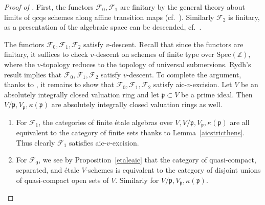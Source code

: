 \documentclass[reqno]{amsart}
\newcommand{\sF}{\mathcal{F}}
\newcommand{\spec}{\mathrm{Spec}}
\theoremstyle{definition}
\begin{document}
\begin{proof}[Proof of ] 
First, the functors $\sF_0, \sF_1$ are finitary by the general theory about limits
of qcqs schemes along affine transition maps (cf.~\cite[Tag
081C]{stacks-project}).  Similarly $\sF_2$ is finitary, as a presentation of
the algebraic space can be descended, cf.~\cite[Tags 07SJ, 084V]{stacks-project}. 


The functors $\sF_0, \sF_1, \sF_2$ satisfy $v$-descent. 
Recall that since the functors are finitary, it suffices to check $v$-descent on
schemes of finite type over $\spec( \mathbb{Z})$, where the $v$-topology
reduces to the topology of universal
submersions. Rydh's result \cite[Cor.~5.18]{Rydh} implies that $\sF_0,
\sF_1, \sF_2$ satisfy
$v$-descent. 
To complete the argument, thanks to ,  it remains to show that $\sF_0, \sF_1, \sF_2$ satisfy
aic-$v$-excision. 
Let $V$ be an absolutely integrally closed valuation ring and let $\mathfrak{p} \subset V$ be a prime
ideal. 
Then $V/\mathfrak{p}, V_{\mathfrak{p}}, \kappa( \mathfrak{p})$ are absolutely integrally closed valuation rings as well.
\begin{enumerate}
\item  
For $\sF_1$, 
 the
categories of finite \'etale algebras over $V, V/\mathfrak{p},
V_{\mathfrak{p}}, \kappa( \mathfrak{p})$ are all equivalent to the category of
finite sets thanks to Lemma~\ref{aicstricthens}. Thus clearly $\sF_1$ satisfies
aic-$v$-excision. 

\item
For $\sF_0$, we see by Proposition~\ref{etaleaic}
that the category of quasi-compact, separated, and  \'etale $V$-schemes is equivalent
to the category of disjoint unions of quasi-compact open sets of $V$.  Similarly
for $V/\mathfrak{p}, V_{\mathfrak{p}}, \kappa( \mathfrak{p})$. 



\end{enumerate}
\end{proof}
\end{document}
